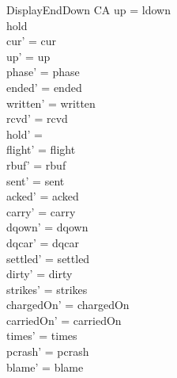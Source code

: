 \documentclass[a4paper,10pt,fleqn]{article}
\begin{document}
\begin{schema}{DisplayEndDown}
  \Delta CA
\where
  up = ldown \\
  hold \neq \emptyset \\
  cur' = cur \\
  up' = up \\
  phase' = phase \\
  ended' = ended \\
  written' = written \\
  rcvd' = rcvd \\
  hold' = \emptyset \\
  flight' = flight \\
  rbuf' = rbuf \\
  sent' = sent \\
  acked' = acked \\
  carry' = carry \\
  dqown' = dqown \\
  dqcar' = dqcar \\
  settled' = settled \\
  dirty' = dirty \\
  strikes' = strikes \\
  chargedOn' = chargedOn \\
  carriedOn' = carriedOn \\
  times' = times \\
  pcrash' = pcrash \\
  blame' = blame
\end{schema}
\end{document}
